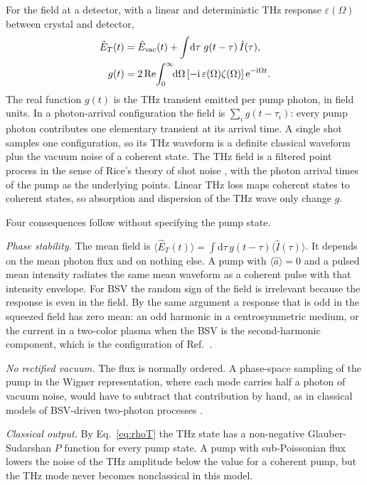 \documentclass[aps,pra,reprint,superscriptaddress,amsmath,amssymb,floatfix]{revtex4-2}
\newcommand{\Iop}{\hat I}
\newcommand{\dd}{\mathrm{d}}
\newcommand{\ee}{\mathrm{e}}
\newcommand{\ii}{\mathrm{i}}
\begin{document}
For the field at a detector, with a linear and deterministic THz response
$\varepsilon(\Omega)$ between crystal and detector,
\begin{align}
\hat E_T(t)&=\hat E_{\rm vac}(t)+\int\!\dd\tau\;g(t-\tau)\,\Iop(\tau),
\label{eq:field}\\
g(t)&=2\,\mathrm{Re}\!\int_0^\infty\!\!\dd\Omega\,
[-\ii\,\varepsilon(\Omega)\zeta(\Omega)]\,\ee^{-\ii\Omega t}.
\end{align}
The real function $g(t)$ is the THz transient emitted per pump photon, in
field units. In a photon-arrival configuration the field is
$\sum_i g(t-\tau_i)$: every pump photon contributes one elementary transient
at its arrival time. A single shot samples one configuration, so its THz
waveform is a definite classical waveform plus the vacuum noise of a coherent
state. The THz field is a filtered point process in the sense
of Rice's theory of shot noise \cite{rice1944}, with the photon arrival times
of the pump as the underlying points. Linear THz loss maps coherent states to
coherent states, so absorption and dispersion of the THz wave only change
$g$.

Four consequences follow without specifying the pump state.

\emph{Phase stability.} The mean field is
$\langle\hat E_T(t)\rangle=\int\!\dd\tau\,g(t-\tau)\langle\Iop(\tau)\rangle$.
It depends on the mean photon flux and on nothing else. A pump with
$\langle\hat a\rangle=0$ and a pulsed mean intensity radiates the same mean
waveform as a coherent pulse with that intensity envelope. For BSV the random
sign of the field is irrelevant because the response is even in the field.
By the same argument a response that is odd in the squeezed field has zero
mean: an odd harmonic in a centrosymmetric medium, or the current in a
two-color plasma when the BSV is the second-harmonic component, which is the
configuration of Ref.~\cite{wangthz2026}.

\emph{No rectified vacuum.} The flux is normally ordered. A phase-space
sampling of the pump in the Wigner representation, where each mode carries
half a photon of vacuum noise, would have to subtract that contribution by
hand, as in classical models of BSV-driven two-photon processes
\cite{raymer2023}.

\emph{Classical output.} By Eq.~\eqref{eq:rhoT} the THz state has a
non-negative Glauber-Sudarshan $P$ function for every pump state. A pump with
sub-Poissonian flux lowers the noise of the THz amplitude below the value for
a coherent pump, but the THz mode never becomes nonclassical in this model.
\end{document}
